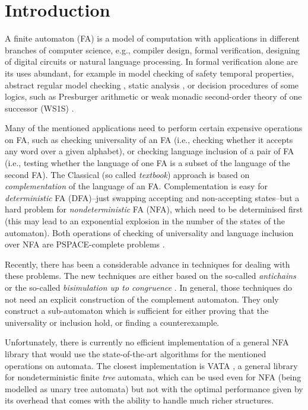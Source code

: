\chapter{Introduction}
\label{introduction}
A finite automaton (FA) is a model of computation with applications in different branches of computer science, e.g., compiler design, formal verification, 
designing of digital circuits or natural language processing. In formal verification alone are its uses abundant, 
for example in model checking of safety temporal properties, abstract regular model checking \cite{armc}, static analysis \cite{metal}, 
or decision procedures of some logics, such as Presburger arithmetic or weak 
monadic second-order theory of one successor (WS1S) \cite{mona}.

Many of the mentioned applications need to perform certain expensive operations on FA, such as checking universality of an FA (i.e., checking whether it
accepts any word over a given alphabet), or checking language inclusion of a pair of FA (i.e., testing whether the language of one FA is a subset of the language
of the second FA). The Classical (so called \emph{textbook}) approach is based on \emph{complementation} of the language of an FA. Complementation is easy for 
\emph{deterministic} FA (DFA)--just swapping accepting and non-accepting states--but a hard problem for \emph{nondeterministic} FA (NFA), which need 
to be determinised first (this may lead to an exponential explosion in the number of the states of the automaton). 
Both operations of checking of universality and language inclusion over NFA are PSPACE-complete problems \cite{cav06}.

Recently, there has been a considerable advance in techniques for dealing with these problems. The new techniques are either based on the so-called 
\emph{antichains} \cite{cav06,tacas10} or the so-called \emph{bisimulation up to congruence} \cite{popl13}. 
In general, those techniques do not need an explicit construction of the complement
automaton. They only construct a sub-automaton which is sufficient for either proving that the universality or inclusion hold, or finding a counterexample.

Unfortunately, there is currently no efficient implementation of a general NFA library that would use the state-of-the-art algorithms for the mentioned
operations on automata. The
closest implementation is VATA \cite{libvata}, a general library for nondeterministic finite \emph{tree} automata, which can be used even for NFA (being modelled 
as unary tree automata) but not with the optimal performance given by its overhead that comes with the ability to handle much richer structures. 
 
